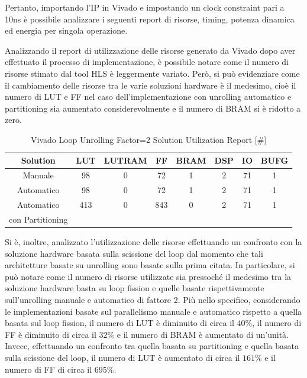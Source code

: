 Pertanto, importando l'IP in Vivado e impostando un clock constraint pari a 10ns è possibile analizzare i seguenti report di risorse, timing, potenza dinamica ed energia per singola operazione.


Analizzando il report di utilizzazione delle risorse generato da Vivado dopo aver effettuato il processo di implementazione, è possibile notare come il numero di risorse stimato dal tool HLS è leggermente variato. Però, si può evidenziare come il cambiamento delle risorse tra le varie soluzioni hardware è il medesimo, cioè il numero di LUT e FF nel caso dell'implementazione con unrolling automatico e partitioning sia aumentato considerevolmente e il numero di BRAM si è ridotto a zero.

\begin{table}[H]
    \centering
    \begin{tabular}{|c|c|c|c|c|c|c|c|}
        \hline
        \textbf{Solution} & \textbf{LUT} & \textbf{LUTRAM} & \textbf{FF} & \textbf{BRAM} & \textbf{DSP} & \textbf{IO} & \textbf{BUFG} \\
        \hline
        Manuale & 98 & 0 & 72 & 1 & 2 & 71 & 1 \\
        \hline
        Automatico & 98 & 0 & 72 & 1 & 2 & 71 & 1 \\
        \hline
        Automatico & 413 & 0 & 843 & 0 & 2 & 71 & 1 \\
        con Partitioning & & & & & & & \\
        \hline
    \end{tabular}
    \caption{Vivado Loop Unrolling Factor=2 Solution Utilization Report [\#]}
    \label{tab:vivado-loop-unrolling-factor2-utilization-report}
\end{table}

Si è, inoltre, analizzato l'utilizzazione delle risorse effettuando un confronto con la soluzione hardware basata sulla scissione del loop dal momento che tali architetture basate su unrolling sono basate sulla prima citata. In particolare, si può notare come il numero di risorse utilizzate sia pressoché il medesimo tra la soluzione hardware basta su loop fission e quelle basate rispettivamente sull'unrolling manuale e automatico di fattore 2. Più nello specifico, considerando le implementazioni basate sul parallelismo manuale e automatico rispetto a quella basata sul loop fission, il numero di LUT è diminuito di circa il $40\%$, il numero di FF è diminuito di circa il $32\%$ e il numero di BRAM è aumentato di un'unità. Invece, effettuando un confronto tra quella basata su partitioning e quella basata sulla scissione del loop, il numero di LUT è aumentato di circa il $161\%$ e il numero di FF di circa il $695\%$.

